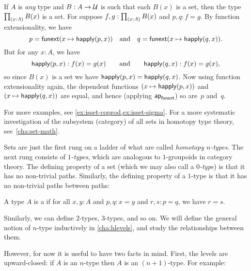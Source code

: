 \begin{eg}\label{thm:isset-forall}
  If $A$ is \emph{any} type and $B:A\to \mathcal{U}$ is such that each $B(x)$ is a set, then the type $\prd{x:A} B(x)$ is a set.
  For suppose $f,g:\prd{x:A} B(x)$ and $p,q:f=g$.
  By function extensionality, we have
  \begin{equation*}
    p = {\mathsf{funext} (x \mapsto \mathsf{happly}(p,x))}
    \quad\text{and}\quad
    q = {\mathsf{funext} (x \mapsto \mathsf{happly}(q,x))}.
  \end{equation*}
  But for any $x:A$, we have
  \begin{equation*}
   \mathsf{happly}(p,x):f(x)=g(x)
   \qquad\text{and}\qquad
   \mathsf{happly}(q,x):f(x)=g(x), 
  \end{equation*}
  so since $B(x)$ is a set we have $\mathsf{happly}(p,x) = \mathsf{happly}(q,x)$.
  Now using function extensionality again, the dependent functions $(x \mapsto \mathsf{happly}(p,x))$ and $(x \mapsto \mathsf{happly}(q,x))$ are equal, and hence (applying $\mathsf{ap}_{\mathsf{funext}}$) so are~$p$ and~$q$.
\end{eg}

For more examples, see \autoref{ex:isset-coprod,ex:isset-sigma}.  For a more systematic investigation of the subsystem (category) of all sets in homotopy type theory, see~\autoref{cha:set-math}.

Sets are just the first rung on a ladder of what are called \emph{homotopy $n$-types}.
The next rung consists of \emph{$1$-types}, which are analogous to $1$-groupoids in category theory.
The defining property of a set (which we may also call a \emph{$0$-type}) is that it has no non-trivial paths.
Similarly, the defining property of a $1$-type is that it has no non-trivial paths between paths:

\begin{defn}\label{defn:1type}
  A type $A$ is a 
  if for all $x,y:A$ and $p,q:x=y$ and $r,s:p=q$, we have $r=s$.
\end{defn}

Similarly, we can define $2$-types, $3$-types, and so on.
We will define the general notion of $n$-type inductively in \autoref{cha:hlevels}, and study the relationships between them.

However, for now it is useful to have two facts in mind.
First, the levels are upward-closed: if $A$ is an $n$-type then $A$ is an $(n+1)$-type.
For example:


